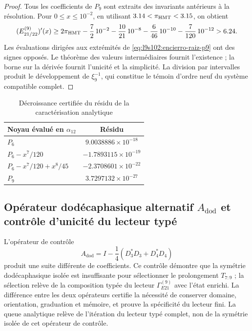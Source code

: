 \begin{proof}
Tous les coefficients de \(P_9\) sont extraits des invariants antérieurs à
la résolution. Pour \(0\leq x\leq10^{-2}\), en utilisant
\(3.14<\pi_{\rm HMT}<3.15\), on obtient
\[
 (E_{21/22}^{(9)})'(x)
 \geq 2\pi_{\rm HMT}-\frac72\,10^{-2}
 -\frac{10}{21}\,10^{-8}-\frac6{46}\,10^{-10}
 -\frac7{120}\,10^{-12}>6.24.
\]
Les évaluations dirigées aux extrémités de
\cref{eq:l9s102:encierro-raiz-p9} ont des signes opposés. Le théorème des
valeurs intermédiaires fournit l'existence ; la borne sur la dérivée fournit
l'unicité et la simplicité. La division par intervalles produit le développement de
\(\xi_9^{-1}\), qui constitue le témoin d'ordre neuf du système
compatible complet.
\end{proof}

\begin{table}[htbp]
\centering
\caption{Décroissance certifiée du résidu de la caractérisation analytique}
\label{tab:l9s102:alpha-residuos}
\begin{tabular}{@{}lc@{}}
\toprule
Noyau évalué en \(\alpha_{12}\) & Résidu \\
\midrule
\(P_6\) & \(9.0038886\times10^{-18}\) \\
\(P_6-x^7/120\) & \(-1.7893115\times10^{-19}\) \\
\(P_6-x^7/120+x^8/45\) & \(-2.3708601\times10^{-22}\) \\
\(P_9\) & \(3.7297132\times10^{-27}\) \\
\bottomrule
\end{tabular}
\end{table}

\subsection{Opérateur dodécaphasique alternatif \texorpdfstring{\(A_{\mathrm{dod}}\)}{A_dod} et contrôle d'unicité du lecteur typé}
\label{sec:l9s102:alpha-control}

L'opérateur de contrôle
\begin{equation}
 A_{\mathrm{dod}}
 =I-\frac14(D_3^*D_3+D_4^*D_4)
 \label{eq:l9s102:alpha-control-alternativo}
\end{equation}
produit une suite différente de coefficients. Ce contrôle démontre que
la symétrie dodécaphasique isolée est insuffisante pour sélectionner le
prolongement \(T_{7:9}\) ; la sélection relève de la composition typée du
lecteur \(\Gamma_{E21}^{(9)}\) avec l'état enrichi. La différence entre
les deux opérateurs certifie la nécessité de conserver domaine, orientation,
graduation et mémoire, et prouve la spécificité du lecteur fini. La queue
analytique relève de l'itération du lecteur typé complet, non de la
symétrie isolée de cet opérateur de contrôle.

